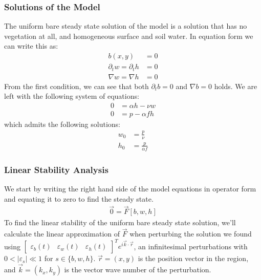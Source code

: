 \documentclass{article}
\numberwithin{equation}{section}
\begin{document}
\subsubsection{Solutions of the Model}
The uniform bare steady state solution of the model is a solution that has no vegetation at all, and homogeneous surface and soil water. In equation form we can write this as:
\begin{align}
    b(x,y)                      & =0  \\
    \partial_t w = \partial_t h & = 0 \\
    \nabla w = \nabla h         & = 0
\end{align}
From the first condition, we can see that both $\partial_tb=0$ and $\nabla b=0$ holds. We are left with the following system of equations:
\begin{align}
    0 & = \alpha h - \nu w \\
    0 & = p-\alpha f h
\end{align}
which admits the following solutions:
\begin{align}
    w_0 & = \frac{p}{\nu}      \\
    h_0 & = \frac{p}{\alpha f}
\end{align}
\subsubsection{Linear Stability Analysis}
We start by writing the right hand side of the model equations in operator form and equating it to zero to find the steady state.
\begin{align}\label{eqn:functional_eq}
    \vec{0}=\vec{F}[b,w,h]
\end{align}
To find the linear stability of the uniform bare steady state solution, we'll calculate the linear approximation of $\vec{F}$  when perturbing the solution we found using $\begin{bmatrix}\varepsilon_b(t) & \varepsilon_w(t) & \varepsilon_h(t)\end{bmatrix}^T e^{i\vec{k}\cdot\vec{r}}$, an infinitesimal perturbations with $0<|\varepsilon_s|\ll1$ for $s\in \{b,w,h\}$.  $\vec{r}=(x,y)$ is the position vector in the region, and $\vec{k}=(k_x,k_y)$ is the vector wave number of the perturbation.
\end{document}
